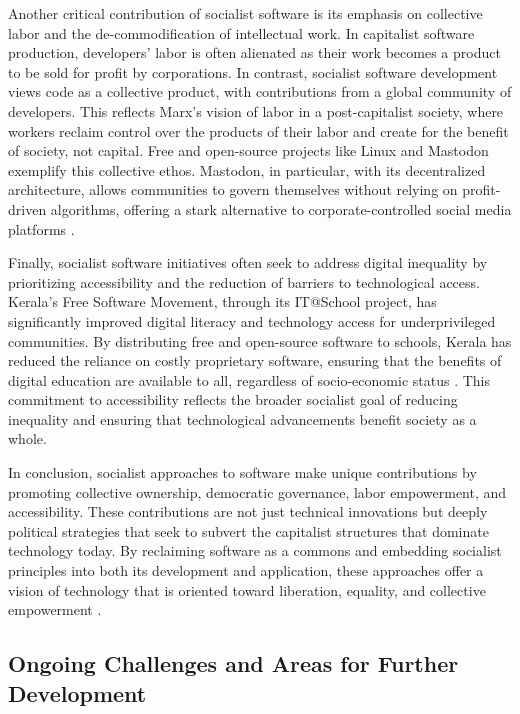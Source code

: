 \begin{refsection}
Another critical contribution of socialist software is its emphasis on collective labor and the de-commodification of intellectual work. In capitalist software production, developers’ labor is often alienated as their work becomes a product to be sold for profit by corporations. In contrast, socialist software development views code as a collective product, with contributions from a global community of developers. This reflects Marx’s vision of labor in a post-capitalist society, where workers reclaim control over the products of their labor and create for the benefit of society, not capital. Free and open-source projects like Linux and Mastodon exemplify this collective ethos. Mastodon, in particular, with its decentralized architecture, allows communities to govern themselves without relying on profit-driven algorithms, offering a stark alternative to corporate-controlled social media platforms \cite[pp.~124]{moody2002}.

Finally, socialist software initiatives often seek to address digital inequality by prioritizing accessibility and the reduction of barriers to technological access. Kerala’s Free Software Movement, through its IT@School project, has significantly improved digital literacy and technology access for underprivileged communities. By distributing free and open-source software to schools, Kerala has reduced the reliance on costly proprietary software, ensuring that the benefits of digital education are available to all, regardless of socio-economic status \cite[pp.~20]{kwet2021}. This commitment to accessibility reflects the broader socialist goal of reducing inequality and ensuring that technological advancements benefit society as a whole.

In conclusion, socialist approaches to software make unique contributions by promoting collective ownership, democratic governance, labor empowerment, and accessibility. These contributions are not just technical innovations but deeply political strategies that seek to subvert the capitalist structures that dominate technology today. By reclaiming software as a commons and embedding socialist principles into both its development and application, these approaches offer a vision of technology that is oriented toward liberation, equality, and collective empowerment \cite[pp.~45]{stallman2010}.

\subsection{Ongoing Challenges and Areas for Further Development}


\end{refsection}

